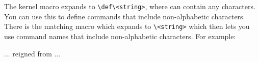 \begin{syntax}
\cmd{\@namedef} \\
\cmd{\@nameuse} \\
\end{syntax}
The kernel \cmd{\@namedef} macro expands to \verb?\def\<string>?, where 
 can contain any characters. You can use this to
define commands that include non-alphabetic characters. There is 
the matching \cmd{\@nameuse} macro which expands to \verb?\<string>?
which then lets you use command names that include non-alphabetic
characters. For example:
\begin{lcode}
...
\makeatletter{}\makeatother reigned from ...
\end{lcode}

\begin{comment}

    \ltx\ lets you create lengths via \cmd{\newlength}.
\begin{syntax}
\cmd{\newdimen}\meta{cmd} \\
\cmd{\newskip}\meta{cmd} \\
\end{syntax}
\tx\ has two kinds of lengths, called \emph{dimension}\index{dimension}
and \emph{glue}\index{glue}. In \ltx\ these are called 
\emph{fixed length}\index{fixed length}\index{length!fixed}
and
\emph{rubber length}\index{rubber length}\index{length!rubber}
respectively.  A new dimension is created by \cmd{\newdimen} and a new
glue by \cmd{\newskip}. It so happens that \ltx's \cmd{\newlength}
always creates a new skip --- all lengths are created as rubber lengths.

    To set a length in \ltx\ you can use any of
several commands, but \tx\ is more parsimonious.
\begin{syntax}
\meta{dimen} = \meta{length} \\
\meta{skip} = \meta{length} plus \meta{length} minus \meta{length} \\
\end{syntax}
A dimension is set by giving it a length, as in
\begin{lcode}
\mydimen = 20pt %
\mydimen 20pt
\end{lcode}
A glue is also set by giving it a length, which is possibly followed
by \Itt{plus} a length optionally followed by \Itt{minus} a length.  
\begin{lcode}
\myskip = 20pt plus 5pt minus 2pt
\end{lcode}
The actual length will normally be the first specified length, but
the value is allowed to be no shorter than the given length less 
the \Itt{minus} length. The value is allowed, but only very reluctantly,
to be greater than the given length plus the \Itt{plus} length.
As in setting a dimension value the \Itt{=} sign is optional. In the example,
\verb?\myskip? can vary anywhere between 18pt and 25pt, but may possibly be
strained to be greater than 25pt.


\end{comment}
